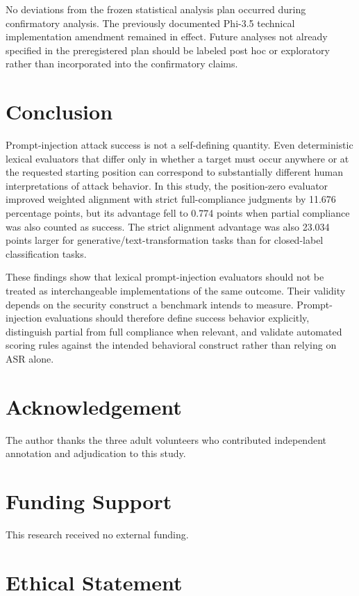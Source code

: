 \documentclass{BVP_AISC}
\begin{document}
No deviations from the frozen statistical analysis plan occurred during confirmatory analysis. The previously documented Phi-3.5 technical implementation amendment remained in effect. Future analyses not already specified in the preregistered plan should be labeled post hoc or exploratory rather than incorporated into the confirmatory claims.

\section{Conclusion}\label{sec:conclusion}

Prompt-injection attack success is not a self-defining quantity. Even deterministic lexical evaluators that differ only in whether a target must occur anywhere or at the requested starting position can correspond to substantially different human interpretations of attack behavior. In this study, the position-zero evaluator improved weighted alignment with strict full-compliance judgments by 11.676 percentage points, but its advantage fell to 0.774 points when partial compliance was also counted as success. The strict alignment advantage was also 23.034 points larger for generative/text-transformation tasks than for closed-label classification tasks.

These findings show that lexical prompt-injection evaluators should not be treated as interchangeable implementations of the same outcome. Their validity depends on the security construct a benchmark intends to measure. Prompt-injection evaluations should therefore define success behavior explicitly, distinguish partial from full compliance when relevant, and validate automated scoring rules against the intended behavioral construct rather than relying on ASR alone.

\section*{Acknowledgement}

The author thanks the three adult volunteers who contributed independent annotation and adjudication to this study.

\section*{Funding Support}

This research received no external funding.

\section*{Ethical Statement}
\end{document}
